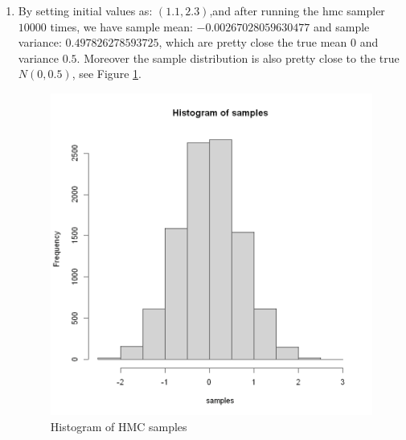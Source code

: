 \documentclass{article}
\begin{document}
\begin{enumerate}
\item 
By setting initial values as: $(1.1, 2.3)$,and after running the hmc sampler $10000$ times, we have sample mean: $-0.00267028059630477$ and sample variance: $0.497826278593725$, which are pretty close the true mean $0$ and variance $0.5$. Moreover the sample distribution is also pretty close to the true $N(0, 0.5)$, see Figure \ref{fig:hist}.
\begin{figure}[H]
\centering
\includegraphics[width = \textwidth, height= 0.5\textheight]{hist.png}
\caption{Histogram of HMC samples}
\label{fig:hist}
\end{figure}
\end{enumerate}

 
\end{document}

